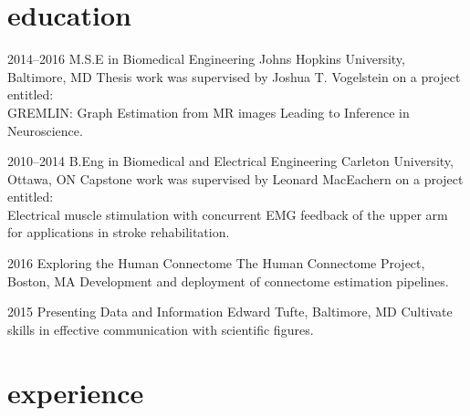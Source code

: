\documentclass[]{friggeri-cv} %
\begin{document}

\section{education}

\begin{entrylist}


\entry
{2014--2016}
{M.S.E {\normalfont in Biomedical Engineering}}
{Johns Hopkins University, Baltimore, MD}
{Thesis work was supervised by Joshua T. Vogelstein on a project entitled:\\GREMLIN: Graph Estimation from MR images Leading to Inference in Neuroscience.}


\entry
{2010--2014}
{B.Eng {\normalfont in Biomedical and Electrical Engineering}}
{Carleton University, Ottawa, ON}
{Capstone work was supervised by Leonard MacEachern on a project entitled:\\Electrical muscle stimulation with concurrent EMG feedback of the upper arm for applications in stroke rehabilitation.}


\entry
{2016}
{Exploring the Human Connectome}
{The Human Connectome Project, Boston, MA}
{Development and deployment of connectome estimation pipelines.}


\entry
{2015}
{Presenting Data and Information}
{Edward Tufte, Baltimore, MD}
{Cultivate skills in effective communication with scientific figures.}

\end{entrylist}


\section{experience}
\end{document}
